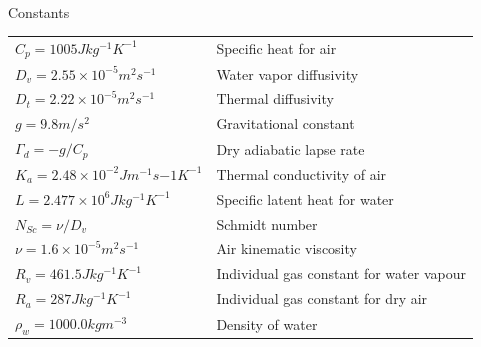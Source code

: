 \documentclass [12pt,letterpaper]{report}
\begin{document}
~\\\noindent \Large Constants \normalsize
\begin{flushleft}
\begin{longtable}{p{6cm}p{13cm}}
 $C_p=1005 J kg^{-1} K^{-1}$ & Specific heat for air \\
 $D_v=2.55 \times 10^{-5} m^2 s^{-1}$ & Water vapor diffusivity\\
 $D_t=2.22 \times 10^{-5} m^2 s^{-1}$ & Thermal diffusivity\\
 $g=9.8 m/s^2$ & Gravitational constant\\
 $\Gamma_d=-g/C_p$ & Dry adiabatic lapse rate\\
 $K_a=2.48 \times 10^{-2} J m^{-1} s{-1} K^{-1}$ & Thermal conductivity of air \\
 $L=2.477 \times 10^6 J kg^{-1} K^{-1}$ & Specific latent heat for water\\
 $N_{Sc} = \nu / D_v$   & Schmidt number \\
 $\nu = 1.6 \times 10^{-5} m^2 s^{-1}$ & Air kinematic viscosity \\
 $R_v=461.5 J kg^{-1} K^{-1}$ & Individual gas constant for water vapour\\
 $R_a=287 J kg^{-1} K^{-1}$ & Individual gas constant for dry air \\
 $\rho_w = 1000.0 kg m^{-3}$   & Density of water \\

 

\end{longtable}
\end{flushleft}
\end{document}
